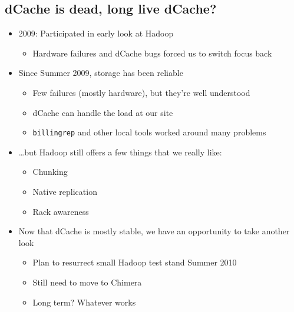 \documentclass{beamer}
\begin{document}
\subsection{dCache is dead, long live dCache?}
\begin{frame}
\begin{itemize}
	\item 2009: Participated in early look at Hadoop
	\begin{itemize}
		\item Hardware failures and dCache bugs forced us to switch focus back
	\end{itemize}
	\item Since Summer 2009, storage has been reliable
	\begin{itemize}
		\item Few failures (mostly hardware), but they're well understood
		\item dCache can handle the load at our site
		\item {\tt billingrep} and other local tools worked around many problems
	\end{itemize}
	\item \ldots{}but Hadoop still offers a few things that we really like:
	\begin{itemize}
		\item Chunking
		\item Native replication
		\item Rack awareness
	\end{itemize}
	\item Now that dCache is mostly stable, we have an opportunity to take another look 
	\begin{itemize}
		\item Plan to resurrect small Hadoop test stand Summer 2010
		\item Still need to move to Chimera
		\item Long term? Whatever works
	\end{itemize}
\end{itemize}
\end{frame}
\end{document}
